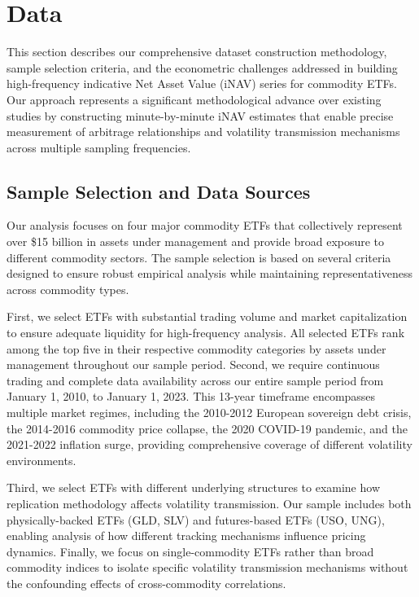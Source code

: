 
\section{Data} \label{sec:data}

This section describes our comprehensive dataset construction methodology, sample selection criteria, and the econometric challenges addressed in building high-frequency indicative Net Asset Value (iNAV) series for commodity ETFs. Our approach represents a significant methodological advance over existing studies by constructing minute-by-minute iNAV estimates that enable precise measurement of arbitrage relationships and volatility transmission mechanisms across multiple sampling frequencies.

\subsection{Sample Selection and Data Sources}

Our analysis focuses on four major commodity ETFs that collectively represent over \$15 billion in assets under management and provide broad exposure to different commodity sectors. The sample selection is based on several criteria designed to ensure robust empirical analysis while maintaining representativeness across commodity types.

First, we select ETFs with substantial trading volume and market capitalization to ensure adequate liquidity for high-frequency analysis. All selected ETFs rank among the top five in their respective commodity categories by assets under management throughout our sample period. Second, we require continuous trading and complete data availability across our entire sample period from January 1, 2010, to January 1, 2023. This 13-year timeframe encompasses multiple market regimes, including the 2010-2012 European sovereign debt crisis, the 2014-2016 commodity price collapse, the 2020 COVID-19 pandemic, and the 2021-2022 inflation surge, providing comprehensive coverage of different volatility environments.

Third, we select ETFs with different underlying structures to examine how replication methodology affects volatility transmission. Our sample includes both physically-backed ETFs (GLD, SLV) and futures-based ETFs (USO, UNG), enabling analysis of how different tracking mechanisms influence pricing dynamics. Finally, we focus on single-commodity ETFs rather than broad commodity indices to isolate specific volatility transmission mechanisms without the confounding effects of cross-commodity correlations.

